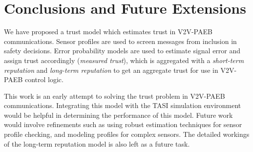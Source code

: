 \documentclass[conference]{IEEEtran}
\begin{document}
\section{Conclusions and Future Extensions}
We have proposed a trust model which estimates trust in V2V-PAEB communications. Sensor profiles are used to screen messages from inclusion in safety decisions. Error probability models are used to estimate signal error and assign trust accordingly (\textit{measured trust}), which is aggregated with a \textit{short-term reputation} and \textit{long-term reputation} to get an aggregate trust for use in V2V-PAEB control logic.

This work is an early attempt to solving the trust problem in V2V-PAEB communications. Integrating this model with the TASI simulation environment would be helpful in determining the performance of this model. Future work would involve refinements such as using robust estimation techniques for sensor profile checking, and modeling profiles for complex sensors. The detailed workings of the long-term reputation model is also left as a future task. 





 
 
 


%
%
\end{document}
